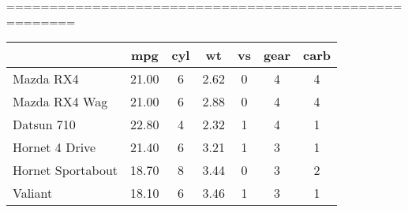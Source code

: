 %
%
======================================================
\begin{tabular}{lcccccc}
\hline
\textbf{} & \textbf{mpg} & \textbf{cyl} & \textbf{wt} & \textbf{vs} & \textbf{gear} & \textbf{carb} \\
\hline
Mazda RX4 & 21.00 & 6 & 2.62 & 0 & 4 & 4\\
Mazda RX4 Wag & 21.00 & 6 & 2.88 & 0 & 4 & 4\\
Datsun 710 & 22.80 & 4 & 2.32 & 1 & 4 & 1\\
Hornet 4 Drive & 21.40 & 6 & 3.21 & 1 & 3 & 1\\
Hornet Sportabout & 18.70 & 8 & 3.44 & 0 & 3 & 2\\
Valiant & 18.10 & 6 & 3.46 & 1 & 3 & 1\\
\hline
\end{tabular}
